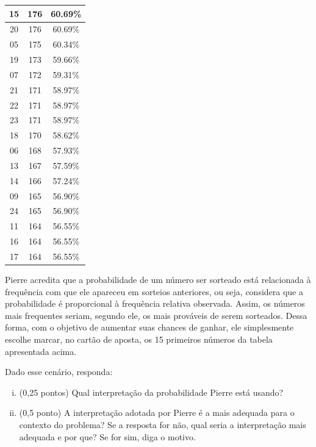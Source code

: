 \documentclass[12pt]{article}
\begin{document}
\begin{enumerate}[a)]
\begin{table}[H]
\begin{tabular}{|c|c|c|}
15 & 176 & 60.69\% \\ \hline
20 & 176 & 60.69\% \\ \hline
05 & 175 & 60.34\% \\ \hline
19 & 173 & 59.66\% \\ \hline
07 & 172 & 59.31\% \\ \hline
21 & 171 & 58.97\% \\ \hline
22 & 171 & 58.97\% \\ \hline
23 & 171 & 58.97\% \\ \hline
18 & 170 & 58.62\% \\ \hline
06 & 168 & 57.93\% \\ \hline
13 & 167 & 57.59\% \\ \hline
14 & 166 & 57.24\% \\ \hline
09 & 165 & 56.90\% \\ \hline
24 & 165 & 56.90\% \\ \hline
11 & 164 & 56.55\% \\ \hline
16 & 164 & 56.55\% \\ \hline
17 & 164 & 56.55\% \\ \hline
\hline
\end{tabular}
\end{table}

Pierre acredita que a probabilidade de um número ser sorteado está relacionada à frequência com que ele apareceu em sorteios anteriores, ou seja, considera que a probabilidade é proporcional à frequência relativa observada. 
Assim, os números mais frequentes seriam, segundo ele, os mais prováveis de serem sorteados. Dessa forma, com o objetivo de aumentar suas chances de ganhar, ele simplesmente escolhe marcar, no cartão de aposta, os 15 primeiros números da tabela apresentada acima.

Dado esse cenário, responda:

\begin{enumerate}[i)]
    \item (0,25 pontos) Qual interpretação da probabilidade Pierre está usando? 
    \item (0,5 ponto) A interpretação adotada por Pierre é a mais adequada para o contexto do problema? Se a resposta for não, qual seria a interpretação mais adequada e por que? Se for sim, diga o motivo. 
\end{enumerate}

\vspace{5px}





\end{enumerate}
\end{document}
